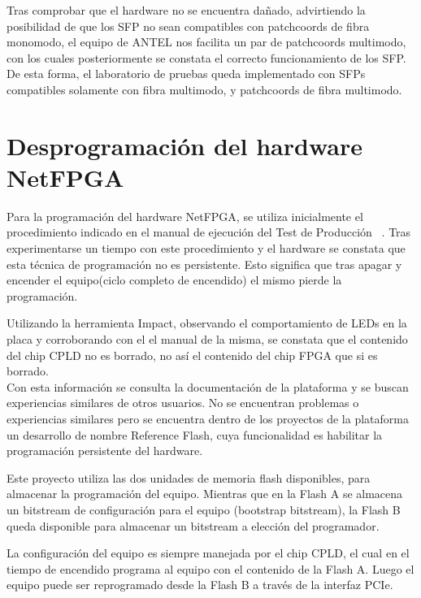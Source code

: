 Tras comprobar que el hardware no se encuentra dañado, advirtiendo la posibilidad de que los SFP no sean compatibles con patchcoords de fibra monomodo, el equipo de ANTEL nos facilita un par de patchcoords multimodo, con los cuales posteriormente se constata el correcto funcionamiento de los SFP.\\

De esta forma, el laboratorio de pruebas queda implementado con SFPs compatibles solamente con fibra multimodo, y patchcoords de fibra multimodo.

\section{Desprogramaci\'on del hardware NetFPGA}
\label{apendiceB2}

Para la programación del hardware NetFPGA, se utiliza inicialmente el procedimiento indicado en el manual de ejecuci\'on del Test de Producci\'on ~\citep{ProdTestManual}. Tras experimentarse un tiempo con este procedimiento y el hardware se constata que esta técnica de programación no es persistente. Esto significa que tras apagar y encender el equipo(ciclo completo de encendido) el mismo pierde la programación. 

Utilizando la herramienta Impact, observando el comportamiento de LEDs en la placa y corroborando con el el manual de la misma, se constata que el contenido del chip CPLD no es borrado, no así el contenido del chip FPGA que si es borrado.\\

Con esta información se consulta la documentación de la plataforma y se buscan experiencias similares  de otros usuarios. No se encuentran problemas o experiencias similares pero se encuentra dentro de los proyectos de la plataforma un desarrollo de nombre Reference Flash, cuya funcionalidad es habilitar la programación persistente del hardware.

Este proyecto utiliza las dos unidades de memoria flash disponibles, para almacenar la programaci\'on del equipo. Mientras que en la Flash A se almacena un bitstream de configuración para el equipo (bootstrap bitstream), la  Flash B queda disponible para almacenar un bitstream a elección del programador. 

La configuración del equipo es siempre manejada por el chip CPLD, el cual en el tiempo de encendido programa al equipo con el contenido de la Flash A. Luego el equipo puede ser reprogramado desde la Flash B a través de la interfaz PCIe.

